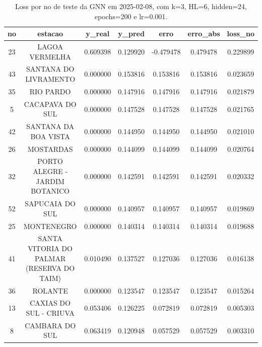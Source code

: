 \begin{table}[h]
\centering
\caption{Loss por no de teste da GNN em 2025-02-08, com k=3, HL=6, hidden=24, epochs=200 e lr=0.001.}
\label{tab:gnn_loss_k3_hl6_h24_e200_d20250208}
\begin{tabular}{ccccccc}
\toprule
no & estacao & y\_real & y\_pred & erro & erro\_abs & loss\_no \\
\midrule
23 & LAGOA VERMELHA & 0.609398 & 0.129920 & -0.479478 & 0.479478 & 0.229899 \\
43 & SANTANA DO LIVRAMENTO & 0.000000 & 0.153816 & 0.153816 & 0.153816 & 0.023659 \\
35 & RIO PARDO & 0.000000 & 0.147916 & 0.147916 & 0.147916 & 0.021879 \\
5 & CACAPAVA DO SUL & 0.000000 & 0.147528 & 0.147528 & 0.147528 & 0.021765 \\
42 & SANTANA DA BOA VISTA & 0.000000 & 0.144950 & 0.144950 & 0.144950 & 0.021010 \\
26 & MOSTARDAS & 0.000000 & 0.144099 & 0.144099 & 0.144099 & 0.020764 \\
32 & PORTO ALEGRE - JARDIM BOTANICO & 0.000000 & 0.142591 & 0.142591 & 0.142591 & 0.020332 \\
52 & SAPUCAIA DO SUL & 0.000000 & 0.140957 & 0.140957 & 0.140957 & 0.019869 \\
25 & MONTENEGRO & 0.000000 & 0.140314 & 0.140314 & 0.140314 & 0.019688 \\
41 & SANTA VITORIA DO PALMAR (RESERVA DO TAIM) & 0.010490 & 0.137527 & 0.127036 & 0.127036 & 0.016138 \\
36 & ROLANTE & 0.000000 & 0.123547 & 0.123547 & 0.123547 & 0.015264 \\
13 & CAXIAS DO SUL - CRIUVA & 0.053406 & 0.126225 & 0.072819 & 0.072819 & 0.005303 \\
8 & CAMBARA DO SUL & 0.063419 & 0.120948 & 0.057529 & 0.057529 & 0.003310 \\
\bottomrule
\end{tabular}
\end{table}
